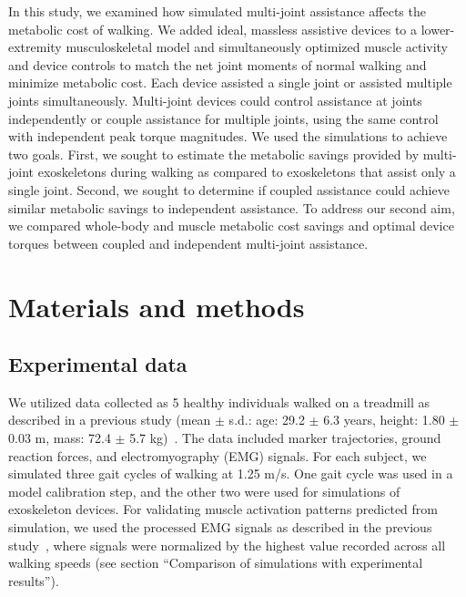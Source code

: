 \documentclass[10pt,letterpaper]{article}
\begin{document}
In this study, we examined how simulated multi-joint assistance affects the metabolic cost of walking. We added ideal, massless assistive devices to a lower-extremity musculoskeletal model and simultaneously optimized muscle activity and device controls to match the net joint moments of normal walking and minimize metabolic cost. Each device assisted a single joint or assisted multiple joints simultaneously. Multi-joint devices could control assistance at joints independently or couple assistance for multiple joints, using the same control with independent peak torque magnitudes. We used the simulations to achieve two goals. First, we sought to estimate the metabolic savings provided by multi-joint exoskeletons during walking as compared to exoskeletons that assist only a single joint. Second, we sought to determine if coupled assistance could achieve similar metabolic savings to independent assistance. To address our second aim, we compared whole-body and muscle metabolic cost savings and optimal device torques between coupled and independent multi-joint assistance.

\section*{Materials and methods}

\subsection*{Experimental data}
We utilized data collected as 5 healthy individuals walked on a treadmill as described in a previous study (mean $\pm$ s.d.: age: 29.2 $\pm$ 6.3 years, height: 1.80 $\pm$ 0.03 m, mass: 72.4 $\pm$ 5.7 kg)~\cite{Arnold:2013}. The data included marker trajectories, ground reaction forces, and electromyography (EMG) signals. For each subject, we simulated three gait cycles of walking at 1.25 m/s. One gait cycle was used in a model calibration step, and the other two were used for simulations of exoskeleton devices. For validating muscle activation patterns predicted from simulation, we used the processed EMG signals as described in the previous study~\cite{Arnold:2013}, where signals were normalized by the highest value recorded across all walking speeds (see section “Comparison of simulations with experimental results”). 
\end{document}
